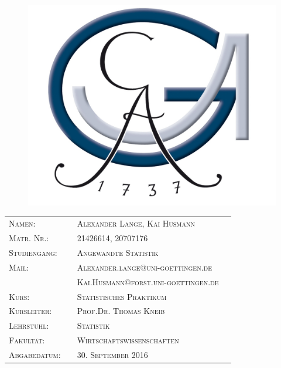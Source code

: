 \documentclass{Vorlage}
\begin{document}

\begin{titlepage}

\begin{figure}
 \begin{center}
 \includegraphics[scale=0.8]{Pictures/logo3}
 \end{center}
\end{figure}
\vspace*{3cm}





\vspace{1cm}

\begin{tabular}{p{3.5cm}|p{0.1cm} p{10cm}l}
\textsc{Namen:} & & \textsc{Alexander Lange, Kai Husmann}\\
\textsc{Matr. Nr.:} & & \textsc{21426614, 20707176}\\
\textsc{Studiengang:} & & \textsc{Angewandte Statistik}\\
\textsc{Mail:} & & \textsc{Alexander.lange$ @ $uni-goettingen.de}\\
\textsc{} & & \textsc{Kai.Husmann$ @ $forst.uni-goettingen.de}\\
\textsc{Kurs:} & & \textsc{Statistisches Praktikum}\\
\textsc{Kursleiter:} & & \textsc{Prof.Dr. Thomas Kneib}\\
\textsc{Lehrstuhl:} & & \textsc{Statistik}\\
\textsc{Fakultät:} & & \textsc{Wirtschaftswissenschaften}\\
\textsc{Abgabedatum:} & & \textsc{30. September 2016}\\
\end{tabular}
\end{titlepage}
\end{document}
